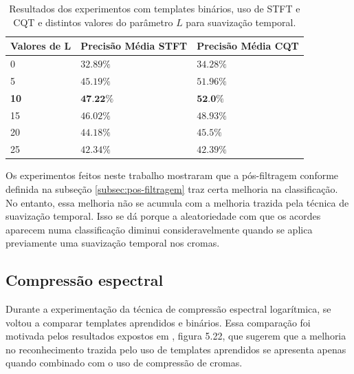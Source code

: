         \begin{table}[h]
        \centering
        \begin{tabular}{|l|l|l|}
            \hline
        
            \textbf{Valores de L} & \textbf{Precisão Média STFT} & \textbf{Precisão Média CQT}\\
        
            \hline
        
            0  & ${32.89}\%$           & ${34.28}\%$          \\
            5  & ${45.19}\%$           & ${51.96}\%$           \\
            \textbf{10} & $\textbf{{47.22}\%}$  & $\textbf{{52.0}\%}$          \\
            15 & ${46.02}\%$           & ${48.93}\%$ \\
            20 & ${44.18}\%$           & ${45.5}\%$          \\
            25 & ${42.34}\%$           & ${42.39}\%$          \\
            
            \hline
        \end{tabular}
        \caption{Resultados dos experimentos com templates binários, uso de STFT e CQT e distintos valores do parâmetro $L$ para suavização temporal.}
        \label{tabela:temp-var-l}
        \end{table}

        Os experimentos feitos neste trabalho mostraram que a pós-filtragem conforme definida na subseção \ref{subsec:pos-filtragem} traz certa melhoria na classificação. No entanto, essa melhoria não se acumula com a melhoria trazida pela técnica de suavização temporal. Isso se dá porque a aleatoriedade com que os acordes aparecem numa classificação diminui consideravelmente quando se aplica previamente uma suavização temporal nos cromas.

    \subsection{Compressão espectral}
        
        Durante a experimentação da técnica de compressão espectral logarítmica, se voltou a comparar templates aprendidos e binários. Essa comparação foi motivada pelos resultados expostos em \cite{muller}, figura 5.22, que sugerem que a melhoria no reconhecimento trazida pelo uso de templates aprendidos se apresenta apenas quando combinado com o uso de compressão de cromas.
        
